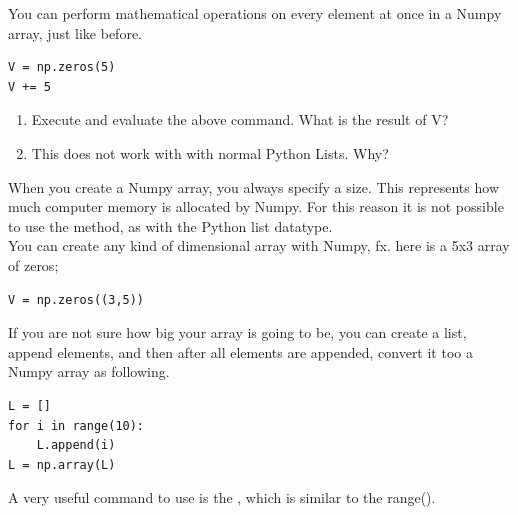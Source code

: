 \documentclass{article}
\begin{document}
You can perform mathematical operations on every element at once in a Numpy array,
just like before.
\begin{lstlisting}
V = np.zeros(5)
V += 5
\end{lstlisting}

\begin{enumerate}[resume]
    \item Execute and evaluate the above command.
        What is the result of V?
    \item This does not work with  with normal Python Lists. Why?
\end{enumerate}

When you create a Numpy array, you always specify a size.
This represents how much computer memory is allocated by Numpy.
For this reason it is not possible to use the  method, as with the Python list datatype.\\

You can create any kind of dimensional array with Numpy, fx. here is a 5x3 array of zeros;

\begin{lstlisting}
V = np.zeros((3,5))
\end{lstlisting}

If you are not sure how big your array is going to be, you can create a list, append elements, and then after all elements are appended, convert it too a Numpy array as following.

\begin{lstlisting}
L = []
for i in range(10):
    L.append(i)
L = np.array(L)
\end{lstlisting}

A very useful command to use is the , which is similar to the range().
\end{document}
